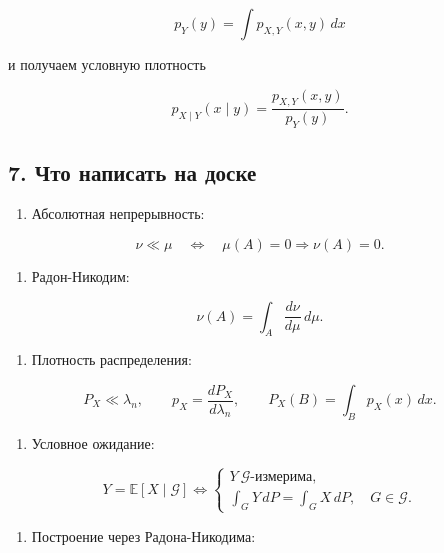\documentclass[
  11pt,
  a4paper,
]{article}
\providecommand{\tightlist}{%
  \setlength{\itemsep}{0pt}\setlength{\parskip}{0pt}}
\begin{document}
\[
p_Y(y)=\int p_{X,Y}(x,y)\,dx
\]

и получаем условную плотность

\[
p_{X\mid Y}(x\mid y)=\frac{p_{X,Y}(x,y)}{p_Y(y)}.
\]

\subsection{7. Что написать на
доске}\label{ux447ux442ux43e-ux43dux430ux43fux438ux441ux430ux442ux44c-ux43dux430-ux434ux43eux441ux43aux435}

\begin{enumerate}
\def\labelenumi{\arabic{enumi}.}
\tightlist
\item
  Абсолютная непрерывность:
\end{enumerate}

\[
\nu\ll\mu
\quad\Longleftrightarrow\quad
\mu(A)=0\Rightarrow\nu(A)=0.
\]

\begin{enumerate}
\def\labelenumi{\arabic{enumi}.}
\setcounter{enumi}{1}
\tightlist
\item
  Радон-Никодим:
\end{enumerate}

\[
\nu(A)=\int_A \frac{d\nu}{d\mu}\,d\mu.
\]

\begin{enumerate}
\def\labelenumi{\arabic{enumi}.}
\setcounter{enumi}{2}
\tightlist
\item
  Плотность распределения:
\end{enumerate}

\[
P_X\ll\lambda_n,
\qquad
p_X=\frac{dP_X}{d\lambda_n},
\qquad
P_X(B)=\int_Bp_X(x)\,dx.
\]

\begin{enumerate}
\def\labelenumi{\arabic{enumi}.}
\setcounter{enumi}{3}
\tightlist
\item
  Условное ожидание:
\end{enumerate}

\[
Y=\mathbb E[X\mid\mathcal G]
\iff
\begin{cases}
Y\ \mathcal G\text{-измерима},\\
\int_GY\,dP=\int_GX\,dP,\quad G\in\mathcal G.
\end{cases}
\]

\begin{enumerate}
\def\labelenumi{\arabic{enumi}.}
\setcounter{enumi}{4}
\tightlist
\item
  Построение через Радона-Никодима:
\end{enumerate}
\end{document}
